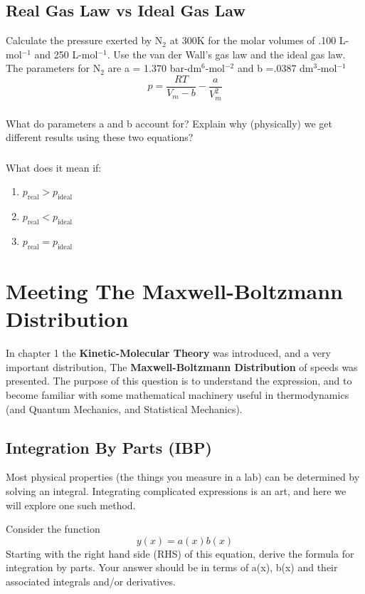 \documentclass{article}
\newcommand{\be}{\begin{equation}}
\newcommand{\ee}{\end{equation}}
\begin{document}
\subsection{Real Gas Law vs Ideal Gas Law}
 Calculate the pressure exerted by N$_2$ at 300K for the molar volumes of .100 L-mol$^{-1}$ and 250 L-mol$^{-1}$. 
Use the van der Wall's gas law and the ideal gas law. 
The parameters for N$_2$ are a =  1.370 bar-dm$^6$-mol$^{-2}$ and b =.0387 dm$^3$-mol$^{-1}$
\be
p=\frac{RT}{V_m - b}-\frac{a}{V^2_m}
\ee

\subsubsection*{}
What do parameters a and b account for?
Explain why (physically) we get different results using these two equations? 
 
 \subsubsection*{}
 What does it mean if:
 \begin{enumerate}
 \item $p_{\text{real}}>p_{\text{ideal}}$
 \item $p_{\text{real}}<p_{\text{ideal}}$
 \item  $p_{\text{real}}=p_{\text{ideal}}$
 \end{enumerate}
 
\section{Meeting The Maxwell-Boltzmann Distribution}
In chapter 1 the \textbf{Kinetic-Molecular Theory} was introduced, and a very important distribution, The \textbf{Maxwell-Boltzmann Distribution} of speeds was presented. 
The purpose of this question is to understand the expression, and to become familiar with some mathematical machinery useful in thermodynamics (and Quantum Mechanics, and Statistical Mechanics). 

\subsection{Integration By Parts (IBP)}
Most physical properties (the things you measure in a lab) can be determined by solving an integral. 
Integrating complicated expressions is an art, and here we will explore one such method.

Consider the function 
\be
y(x) = a(x) b(x)
\ee
Starting with the right hand side (RHS) of this equation, derive the formula for integration by parts.
Your answer should be in terms of a(x), b(x) and their associated integrals and/or derivatives. 
\end{document}

